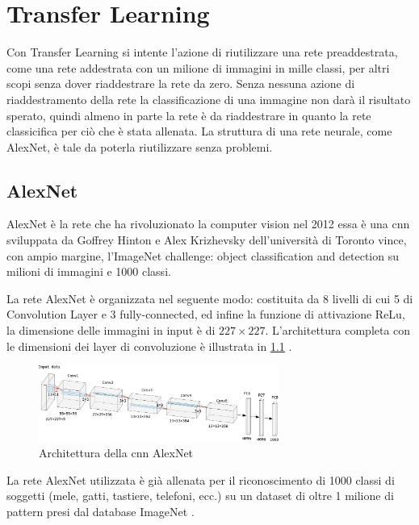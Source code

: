 \chapter{Transfer Learning}\label{transfer-learning}

Con Transfer Learning si intente l'azione di riutilizzare una rete preaddestrata, come una rete addestrata con un milione di immagini in mille classi, per altri scopi senza dover riaddestrare la rete da zero. Senza nessuna azione di riaddestramento della rete la classificazione di una immagine non darà il risultato sperato, quindi almeno in parte la rete è da riaddestrare in quanto la rete classicifica per ciò che è stata allenata. La struttura di una rete neurale, come AlexNet, è tale da poterla riutilizzare senza problemi. 

\section{AlexNet}\label{alexnet}
AlexNet è la rete che ha rivoluzionato la computer vision nel 2012 essa è una \gls{cnn} sviluppata
da Goffrey Hinton e Alex Krizhevsky dell’università di Toronto vince, con ampio margine, 
l’ImageNet challenge: object classification and detection su milioni di immagini e 1000 classi.

La rete AlexNet è organizzata nel seguente modo: costituita da 8 livelli di cui 5 di \gls{Convolution Layer} e 3 \gls{fully-connected}, ed infine la funzione
di attivazione \gls{ReLu}, la dimensione delle immagini in input è di \(227\times 227\). L'architettura completa con le dimensioni dei layer di \gls{convoluzione} è illustrata in \cref{fig:alexnet} \cite{alexnet}.  

\begin{figure}[ht]
    \centering
    \includegraphics[width=0.7\textwidth]{addestramento-rete-neurale/alexnet.pdf}
    \caption{Architettura della \gls{cnn} AlexNet}
    \label{fig:alexnet}
\end{figure}

La rete AlexNet utilizzata è già allenata per il riconoscimento di 1000 classi di soggetti (mele, gatti, tastiere, telefoni, ecc.) su un dataset di oltre 1 milione di pattern presi dal database ImageNet \cite{alexnet}.

